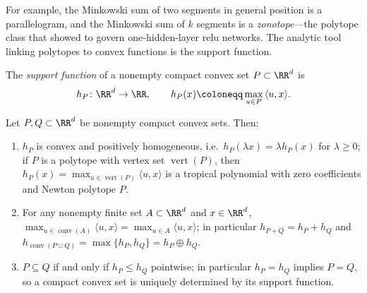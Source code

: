 For example, the Minkowski sum of two segments in general position is a parallelogram, and the Minkowski sum of $k$ segments is a \emph{zonotope}---the polytope class that \textcite{Zhang2018} showed to govern one-hidden-layer \ac{relu} networks. The analytic tool linking polytopes to convex functions is the support function.

\begin{definition}\label{def:support_function}
The \emph{support function} of a nonempty compact convex set $P \subset \RR^{d}$ is
\begin{equation}
	h_{P} \colon \RR^{d} \to \RR,
	\qquad
	h_{P}(x) \coloneqq \max_{u \in P}\, \langle u, x \rangle .
	\label{eq:support_function}
\end{equation}
\end{definition}

\begin{lemmaenv}\label{lem:support_properties}
Let $P, Q \subset \RR^{d}$ be nonempty compact convex sets. Then:
\begin{enumerate}
	\item $h_{P}$ is convex and positively homogeneous, i.e.\ $h_P(\lambda x) = \lambda h_P(x)$ for $\lambda \ge 0$; if $P$ is a polytope with vertex set $\operatorname{vert}(P)$, then $h_{P}(x) = \max_{u \in \operatorname{vert}(P)} \langle u, x \rangle$ is a tropical polynomial with zero coefficients and Newton polytope $P$.
	\item For any nonempty finite set $A \subset \RR^d$ and $x \in \RR^d$, $\max_{u \in \operatorname{conv}(A)} \langle u, x \rangle = \max_{u \in A} \langle u, x \rangle$; in particular $h_{P + Q} = h_{P} + h_{Q}$ and $h_{\operatorname{conv}(P \cup Q)} = \max\{h_{P}, h_{Q}\} = h_P \oplus h_Q$.
	\item $P \subseteq Q$ if and only if $h_{P} \le h_{Q}$ pointwise; in particular $h_{P} = h_{Q}$ implies $P = Q$, so a compact convex set is uniquely determined by its support function.
\end{enumerate}
\hfill{}
\end{lemmaenv}

